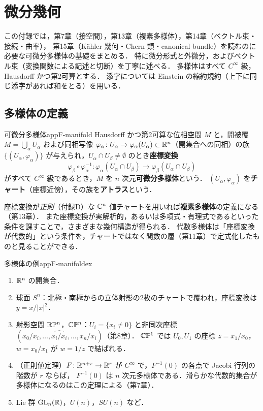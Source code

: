 \chapter{微分幾何}\label{app:F}

この付録では，第7章（接空間），第13章（複素多様体），第14章（ベクトル束・接続・曲率），
第15章（Kähler 幾何・Chern 類・canonical bundle）を読むのに必要な可微分多様体の基礎をまとめる．
特に微分形式と外微分，およびベクトル束（変換関数による記述と切断）を丁寧に述べる．
多様体はすべて $C^\infty$ 級，Hausdorff かつ第2可算とする．
添字については Einstein の縮約規約（上下に同じ添字があれば和をとる）を用いる．

\section{多様体の定義}

\begin{mydef}{可微分多様体}{appF-manifold}
Hausdorff かつ第2可算な位相空間 $M$ と，開被覆 $M=\bigcup_\alpha U_\alpha$ および同相写像
$\varphi_\alpha\colon U_\alpha\to\varphi_\alpha(U_\alpha)\subset\mathbb{R}^n$（開集合への同相）の族
$\{(U_\alpha,\varphi_\alpha)\}$ が与えられ，$U_\alpha\cap U_\beta\ne\emptyset$ のとき\textbf{座標変換}
\[
\varphi_\beta\circ\varphi_\alpha^{-1}\colon\varphi_\alpha(U_\alpha\cap U_\beta)\to\varphi_\beta(U_\alpha\cap U_\beta)
\]
がすべて $C^\infty$ 級であるとき，$M$ を $n$ 次元\textbf{可微分多様体}という．
$(U_\alpha,\varphi_\alpha)$ を\textbf{チャート}（座標近傍），その族を\textbf{アトラス}という．
\end{mydef}

座標変換が\emph{正則}（付録D）な $\mathbb{C}^n$ 値チャートを用いれば\textbf{複素多様体}の定義になる（第13章）．
また座標変換が実解析的，あるいは多項式・有理式であるといった条件を課すことで，さまざまな幾何構造が得られる．
代数多様体は「座標変換が代数的」という条件を，チャートではなく関数の層（第11章）で定式化したものと見ることができる．

\begin{myex}{多様体の例}{appF-manifoldex}
\begin{enumerate}
\item $\mathbb{R}^n$ の開集合．
\item 球面 $S^n$：北極・南極からの立体射影の2枚のチャートで覆われ，座標変換は $y=x/|x|^2$．
\item 射影空間 $\mathbb{R}\mathbb{P}^n$，$\mathbb{C}\mathbb{P}^n$：$U_i=\{x_i\ne0\}$ と非同次座標 $(x_0/x_i,\dots,\widehat{x_i/x_i},\dots,x_n/x_i)$（第8章）．
$\mathbb{C}\mathbb{P}^1$ では $U_0,U_1$ の座標 $z=x_1/x_0$，$w=x_0/x_1$ が $w=1/z$ で結ばれる．
\item （正則値定理）$F\colon\mathbb{R}^{n+r}\to\mathbb{R}^r$ が $C^\infty$ で，$F^{-1}(0)$ の各点で Jacobi 行列の階数が $r$ ならば，
$F^{-1}(0)$ は $n$ 次元多様体である．滑らかな代数的集合が多様体になるのはこの定理による（第7章）．
\item Lie 群 $\operatorname{GL}_n(\mathbb{R})$，$U(n)$，$SU(n)$ など．
\end{enumerate}
\end{myex}

